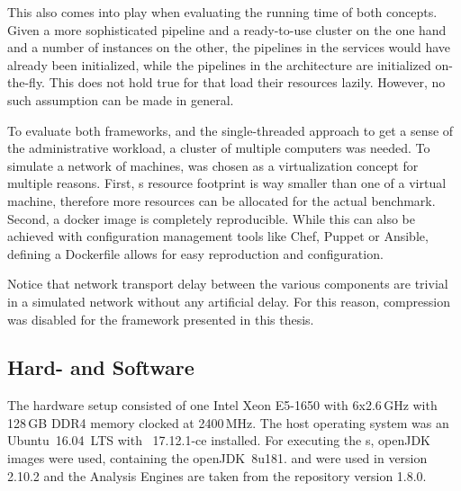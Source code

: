 This also comes into play when evaluating the running time of both concepts. Given a more sophisticated pipeline and a ready-to-use \spark{} cluster on the one hand and a number of \uimaas{} instances on the other, the pipelines in the \uimaas{} services would have already been initialized, while the pipelines in the \spark{} architecture are initialized on-the-fly. This does not hold true for \anens{} that load their resources lazily. However, no such assumption can be made in general.

To evaluate both frameworks, and the single-threaded approach to get a sense of the administrative workload, a cluster of multiple computers was needed. To simulate a network of machines, \docker{} was chosen as a virtualization concept for multiple reasons. First, \docker{}s resource footprint is way smaller than one of a virtual machine, therefore more resources can be allocated for the actual benchmark. Second, a docker image is completely reproducible. While this can also be achieved with configuration management tools like Chef, Puppet or Ansible, defining a Dockerfile allows for easy reproduction and configuration. 

Notice that network transport delay between the various components are trivial in a simulated network without any artificial delay. For this reason, compression was disabled for the framework presented in this thesis.

\subsection{Hard- and Software}
The hardware setup consisted of one Intel Xeon E5-1650 with 6x2.6\,GHz with 128\,GB DDR4 memory clocked at 2400\,MHz. The host operating system was an Ubuntu~16.04~LTS with \docker{}~17.12.1-ce installed. For executing the \jvm{}s, openJDK \docker{} images were used, containing the openJDK~8u181. \uima{} and \uimaas{} were used in version 2.10.2 and the \dkpro{} Analysis Engines are taken from the repository version 1.8.0.

